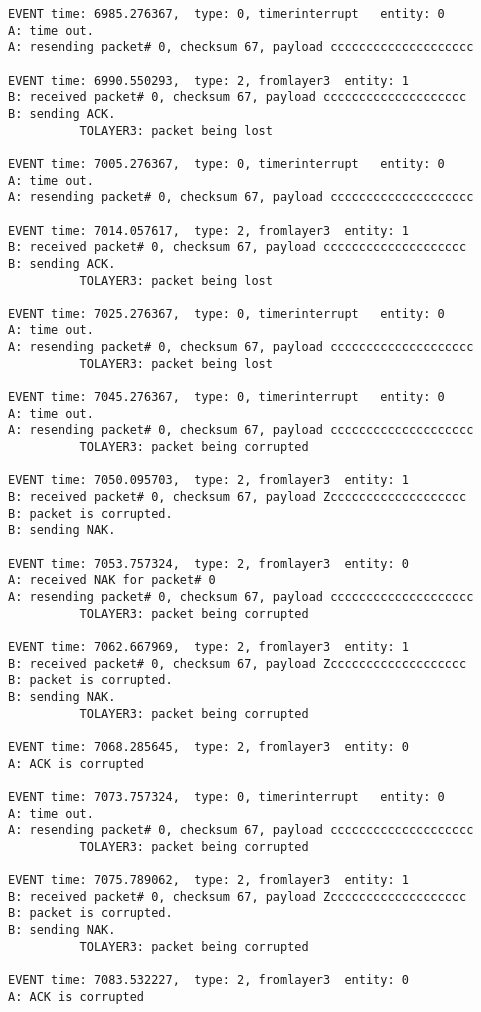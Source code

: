 \documentclass[12pt]{article}
\begin{document}
\begin{Verbatim}[frame=single, rulecolor=\color{cyan}, label=10 messages ACKed correctly]
EVENT time: 6985.276367,  type: 0, timerinterrupt   entity: 0
A: time out. 
A: resending packet# 0, checksum 67, payload cccccccccccccccccccc

EVENT time: 6990.550293,  type: 2, fromlayer3  entity: 1
B: received packet# 0, checksum 67, payload cccccccccccccccccccc
B: sending ACK.
          TOLAYER3: packet being lost

EVENT time: 7005.276367,  type: 0, timerinterrupt   entity: 0
A: time out. 
A: resending packet# 0, checksum 67, payload cccccccccccccccccccc

EVENT time: 7014.057617,  type: 2, fromlayer3  entity: 1
B: received packet# 0, checksum 67, payload cccccccccccccccccccc
B: sending ACK.
          TOLAYER3: packet being lost

EVENT time: 7025.276367,  type: 0, timerinterrupt   entity: 0
A: time out. 
A: resending packet# 0, checksum 67, payload cccccccccccccccccccc
          TOLAYER3: packet being lost

EVENT time: 7045.276367,  type: 0, timerinterrupt   entity: 0
A: time out. 
A: resending packet# 0, checksum 67, payload cccccccccccccccccccc
          TOLAYER3: packet being corrupted

EVENT time: 7050.095703,  type: 2, fromlayer3  entity: 1
B: received packet# 0, checksum 67, payload Zccccccccccccccccccc
B: packet is corrupted.
B: sending NAK.

EVENT time: 7053.757324,  type: 2, fromlayer3  entity: 0
A: received NAK for packet# 0
A: resending packet# 0, checksum 67, payload cccccccccccccccccccc
          TOLAYER3: packet being corrupted

EVENT time: 7062.667969,  type: 2, fromlayer3  entity: 1
B: received packet# 0, checksum 67, payload Zccccccccccccccccccc
B: packet is corrupted.
B: sending NAK.
          TOLAYER3: packet being corrupted

EVENT time: 7068.285645,  type: 2, fromlayer3  entity: 0
A: ACK is corrupted

EVENT time: 7073.757324,  type: 0, timerinterrupt   entity: 0
A: time out. 
A: resending packet# 0, checksum 67, payload cccccccccccccccccccc
          TOLAYER3: packet being corrupted

EVENT time: 7075.789062,  type: 2, fromlayer3  entity: 1
B: received packet# 0, checksum 67, payload Zccccccccccccccccccc
B: packet is corrupted.
B: sending NAK.
          TOLAYER3: packet being corrupted

EVENT time: 7083.532227,  type: 2, fromlayer3  entity: 0
A: ACK is corrupted


\end{Verbatim}
\end{document}
